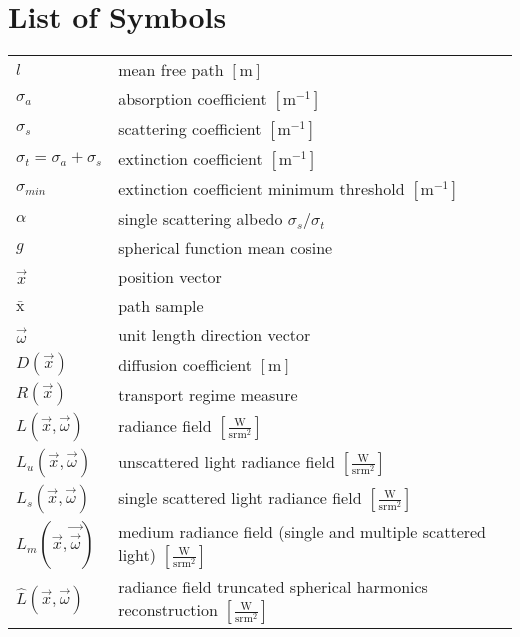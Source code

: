 \chapter*{List of Symbols}

%
\begin{flushleft}

\renewcommand*{\arraystretch}{1.75}
\begin{longtable}[c]{@{}p{28.5mm}@{} p{120.5mm}}
	$l$	&  mean free path $\left[\si{\meter}\right]$\\
	$\sigma_a$	&  absorption coefficient $\left[\si{\meter}^{-1}\right]$
	\\
	$\sigma_s$	&  scattering coefficient $\left[\si{\meter}^{-1}\right]$
	\\
	$\sigma_t=\sigma_a+\sigma_s$	&  extinction coefficient $\left[\si{\meter}^{-1}\right]$
	\\
	$\sigma_{min}$	&  extinction coefficient minimum threshold $\left[\si{\meter}^{-1}\right]$
	\\
	$\alpha$	&  single scattering albedo $\sigma_s/\sigma_t$
	\\
	$g$	&  spherical function mean cosine
	\\
	$\vec{x}$	&  position vector
	\\
	$\bar{\mathrm{x}}$	&  path sample
	\\
	$\vec{\omega}$	&  unit length direction vector
	\\
	$D\left(\vec{x}\right)$	&  diffusion coefficient $\left[\si{\meter}\right]$
	\\
	$R\left(\vec{x}\right)$	&  transport regime measure
	\\
	$L\left(\vec{x}, \vec{\omega}\right)$	&  radiance field $\left[\frac{\si{\watt}}{\si{\steradian} \si{\meter}^2}\right]$
	\\
	$L_u\left(\vec{x}, \vec{\omega}\right)$	&  unscattered light radiance field $\left[\frac{\si{\watt}}{\si{\steradian} \si{\meter}^2}\right]$
	\\
	$L_s\left(\vec{x}, \vec{\omega}\right)$	&  single scattered light radiance field $\left[\frac{\si{\watt}}{\si{\steradian} \si{\meter}^2}\right]$
	\\
	$L_m\left(\vec{x}, \vec{\vec{\omega}}\right)$	&  medium radiance field (single and multiple scattered light) $\left[\frac{\si{\watt}}{\si{\steradian} \si{\meter}^2}\right]$
	\\
	$\widehat{L}\left(\vec{x}, \vec{\omega}\right)$	&  radiance field truncated spherical harmonics reconstruction $\left[\frac{\si{\watt}}{\si{\steradian} \si{\meter}^2}\right]$

\end{longtable}
\end{flushleft}
